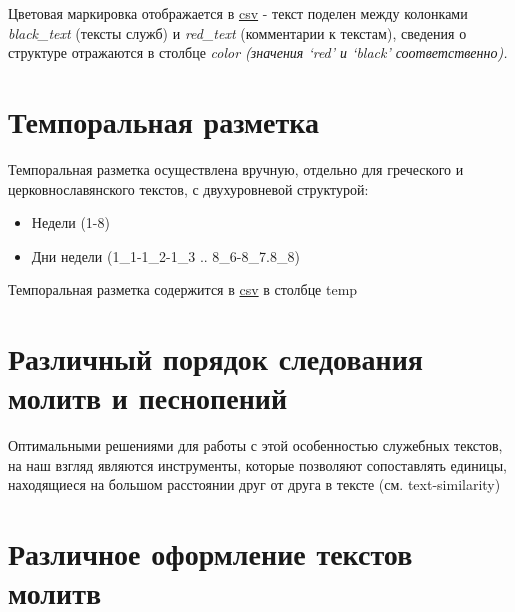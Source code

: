 \documentclass[
  letterpaper,
]{book}
\providecommand{\tightlist}{%
  \setlength{\itemsep}{0pt}\setlength{\parskip}{0pt}}\usepackage{longtable,booktabs,array}
\begin{document}
Цветовая маркировка отображается в
\href{https://github.com/Drozhzhinastya/GSPC/tree/main/csv/markup}{csv}
- текст поделен между колонками \emph{black\_text} (тексты служб) и
\emph{red\_text} (комментарии к текстам), сведения о структуре
отражаются в столбце \emph{color (значения `red' и `black'
соответственно).}

\hypertarget{ux442ux435ux43cux43fux43eux440ux430ux43bux44cux43dux430ux44f-ux440ux430ux437ux43cux435ux442ux43aux430}{%
\section{Темпоральная
разметка}\label{ux442ux435ux43cux43fux43eux440ux430ux43bux44cux43dux430ux44f-ux440ux430ux437ux43cux435ux442ux43aux430}}

Темпоральная разметка осуществлена вручную, отдельно для греческого и
церковнославянского текстов, с двухуровневой структурой:

\begin{itemize}
\tightlist
\item
  Недели (1-8)
\item
  Дни недели (1\_1-1\_2-1\_3 .. 8\_6-8\_7.8\_8)
\end{itemize}

Темпоральная разметка содержится в
\href{https://github.com/Drozhzhinastya/GSPC/tree/main/csv/markup}{csv}
в столбце temp

\hypertarget{ux440ux430ux437ux43bux438ux447ux43dux44bux439-ux43fux43eux440ux44fux434ux43eux43a-ux441ux43bux435ux434ux43eux432ux430ux43dux438ux44f-ux43cux43eux43bux438ux442ux432-ux438-ux43fux435ux441ux43dux43eux43fux435ux43dux438ux439}{%
\section{Различный порядок следования молитв и
песнопений}\label{ux440ux430ux437ux43bux438ux447ux43dux44bux439-ux43fux43eux440ux44fux434ux43eux43a-ux441ux43bux435ux434ux43eux432ux430ux43dux438ux44f-ux43cux43eux43bux438ux442ux432-ux438-ux43fux435ux441ux43dux43eux43fux435ux43dux438ux439}}

Оптимальными решениями для работы с этой особенностью служебных текстов,
на наш взгляд являются инструменты, которые позволяют сопоставлять
единицы, находящиеся на большом расстоянии друг от друга в тексте (см.
text-similarity)

\hypertarget{ux440ux430ux437ux43bux438ux447ux43dux43eux435-ux43eux444ux43eux440ux43cux43bux435ux43dux438ux435-ux442ux435ux43aux441ux442ux43eux432-ux43cux43eux43bux438ux442ux432}{%
\section{Различное оформление текстов
молитв}\label{ux440ux430ux437ux43bux438ux447ux43dux43eux435-ux43eux444ux43eux440ux43cux43bux435ux43dux438ux435-ux442ux435ux43aux441ux442ux43eux432-ux43cux43eux43bux438ux442ux432}}
\end{document}
